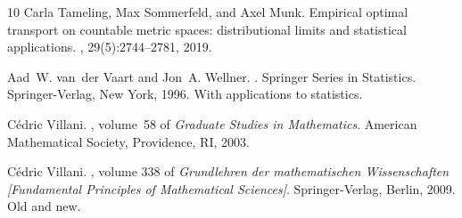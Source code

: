 \documentclass[twoside,11pt,a4paper]{article}
\begin{document}
\begin{thebibliography}{10}
Carla Tameling, Max Sommerfeld, and Axel Munk.
\newblock Empirical optimal transport on countable metric spaces:
  distributional limits and statistical applications.
, 29(5):2744--2781, 2019.

Aad~W. van~der Vaart and Jon~A. Wellner.
.
\newblock Springer Series in Statistics. Springer-Verlag, New York, 1996.
\newblock With applications to statistics.

C\'{e}dric Villani.
, volume~58 of {\em Graduate
  Studies in Mathematics}.
\newblock American Mathematical Society, Providence, RI, 2003.

C\'{e}dric Villani.
, volume 338 of {\em Grundlehren der
  mathematischen Wissenschaften [Fundamental Principles of Mathematical
  Sciences]}.
\newblock Springer-Verlag, Berlin, 2009.
\newblock Old and new.

\end{thebibliography}

 
\end{document}
